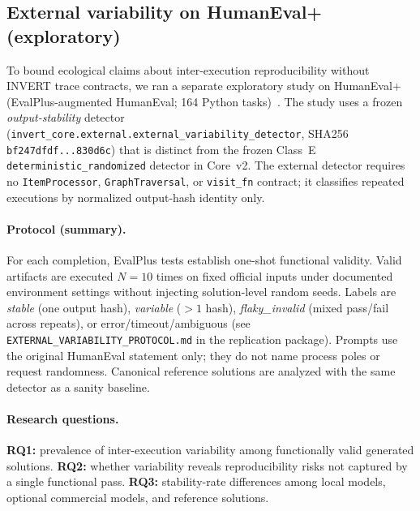 
\subsection{External variability on HumanEval+ (exploratory)}
\label{app:external-variability}

To bound ecological claims about inter-execution reproducibility without INVERT trace contracts, we ran a separate exploratory study on HumanEval+ (EvalPlus-augmented HumanEval; 164 Python tasks)~\cite{liu2023evalplus}.
The study uses a frozen \emph{output-stability} detector (\texttt{invert\_core.external.external\_variability\_detector}, SHA256 \texttt{bf247dfdf...830d6c}) that is distinct from the frozen Class~E \texttt{deterministic\_randomized} detector in Core~v2.
The external detector requires no \texttt{ItemProcessor}, \texttt{GraphTraversal}, or \texttt{visit\_fn} contract; it classifies repeated executions by normalized output-hash identity only.

\paragraph{Protocol (summary).}
For each completion, EvalPlus tests establish one-shot functional validity.
Valid artifacts are executed $N{=}10$ times on fixed official inputs under documented environment settings without injecting solution-level random seeds.
Labels are \emph{stable} (one output hash), \emph{variable} ($>1$ hash), \emph{flaky\_invalid} (mixed pass/fail across repeats), or error/timeout/ambiguous (see \texttt{EXTERNAL\_VARIABILITY\_PROTOCOL.md} in the replication package).
Prompts use the original HumanEval statement only; they do not name process poles or request randomness.
Canonical reference solutions are analyzed with the same detector as a sanity baseline.

\paragraph{Research questions.}
\textbf{RQ1:} prevalence of inter-execution variability among functionally valid generated solutions.
\textbf{RQ2:} whether variability reveals reproducibility risks not captured by a single functional pass.
\textbf{RQ3:} stability-rate differences among local models, optional commercial models, and reference solutions.

